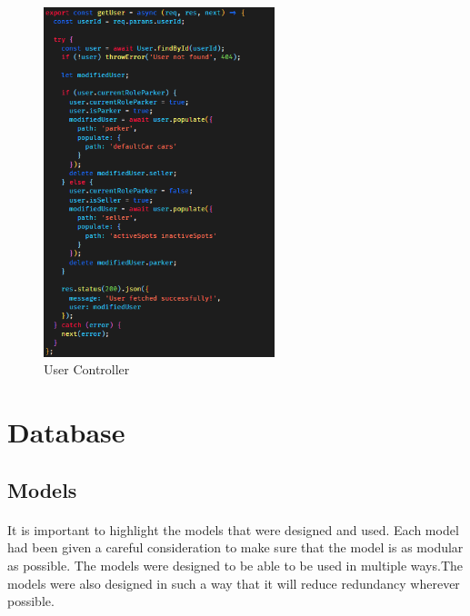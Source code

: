    \begin{figure}[h]
        \centering
        \includegraphics[width=0.6\textwidth]{images/userController.png}
        \caption{User Controller}
        \label{fig:userController}
    \end{figure}

    \pagebreak






















    \section{Database}
    \subsection{Models}
    \paragraph*{}
        It is important to highlight the models that were designed and used.
        Each model had been given a careful consideration to make sure that the model is as modular as possible. The models were designed to be able to be used in multiple ways.The models were also designed in such a way that it will reduce redundancy wherever possible.\\

